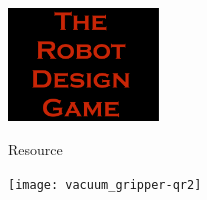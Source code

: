 \documentclass[11pt]{article}
\begin{document}
\color{white}            
    
    \begin{center}
        
        \rule{0pt}{10mm}    


        \includegraphics[trim=5 5 5 5,clip,height=3cm]{rdg_logo}%
        
        \rule{0pt}{5mm}    
        
        

Resource



        \rule{0pt}{5mm}    

        \texttt{[image: vacuum\_gripper-qr2]}%

        

    \end{center}
\end{document}
